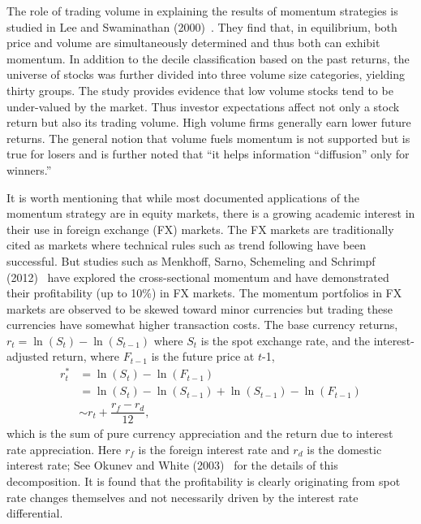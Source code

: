 The role of trading volume in explaining the results of momentum strategies is studied in Lee and Swaminathan (2000)~\cite{lee2000}. They find that, in equilibrium, both price and volume are simultaneously determined and thus both can exhibit momentum. In addition to the decile classification based on the past returns, the universe of stocks was further divided into three volume size categories, yielding thirty groups. The study provides evidence that low volume stocks tend to be under-valued by the market. Thus investor expectations affect not only a stock return but also its trading volume. High volume firms generally earn lower future returns. The general notion that volume fuels momentum is not supported but is true for losers and is further noted that ``it helps information ``diffusion'' only for winners.''


It is worth mentioning that while most documented applications of the momentum strategy are in equity markets, there is a growing academic interest in their use in foreign exchange (FX) markets. The FX markets are traditionally cited as markets where technical rules such as trend following have been successful. But studies such as Menkhoff, Sarno, Schemeling and Schrimpf (2012)~\cite{menkhoff2012} have explored the cross-sectional momentum and have demonstrated their profitability (up to 10\%) in FX markets. The momentum portfolios in FX markets are observed to be skewed toward minor currencies but trading these currencies have somewhat higher transaction costs. The base currency returns, $r_t= \ln(S_t) - \ln(S_{t-1})$ where $S_t$ is the spot exchange rate, and the interest-adjusted return, where $F_{t-1}$ is the future price at $t$-1,
	\begin{equation}
	\begin{aligned}
	r_t^* &= \ln(S_t) - \ln(F_{t-1}) \\
	&= \ln(S_t) - \ln(S_{t-1}) + \ln(S_{t-1}) - \ln(F_{t-1}) \\
	&\sim r_t + \dfrac{r_f - r_d}{12},
	\end{aligned}
	\end{equation}
which is the sum of pure currency appreciation and the return due to interest rate appreciation. Here $r_f$ is the foreign interest rate and $r_d$ is the domestic interest rate; See Okunev and White (2003)~\cite{okunev2003} for the details of this decomposition. It is found that the profitability is clearly originating from spot rate changes themselves and not necessarily driven by the interest rate differential.


